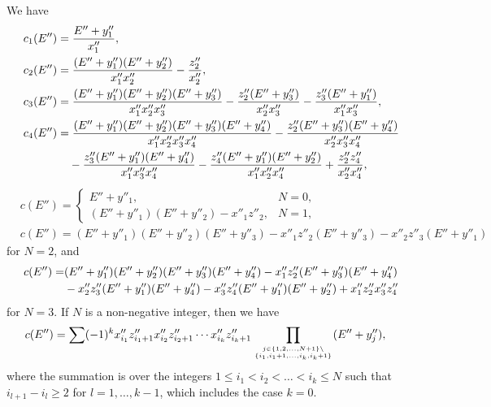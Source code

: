 \documentclass[12pt]{amsart}
\numberwithin{equation}{section}
\theoremstyle{definition}
\theoremstyle{remark}
\begin{document}
We have
\begin{align*}
 & c_{1}(E'') = \frac{E'' + y''_1}{x''_1} , \\
 & c_{2}(E'') = \frac{(E'' + y''_1 )  (E'' + y'' _2 )}{x''_1 x''_2}  - \frac{z''_2}{x''_2} , \notag \\
 & c_{3}(E'') = \frac{(E'' + y''_1 ) (E'' + y''_2) (E'' + y''_3) }{x''_1 x''_2 x''_3} - \frac{z''_2 (E'' + y''_3 )}{x''_2 x''_3} - \frac{z''_3 (E'' + y''_1) }{x''_1 x''_3} , \notag \\
 & c_{4}(E'') = \frac{(E'' + y''_1 ) (E'' + y''_2) (E'' + y''_3) (E'' + y''_4) }{x''_1 x''_2 x''_3 x''_4} - \frac{z''_2 (E'' + y''_3 ) (E'' + y''_4) }{x''_2 x''_3 x''_4}  \notag \\
& \qquad \qquad - \frac{z''_3 (E'' + y''_1) (E'' + y''_4)}{x''_1 x''_3 x''_4} - \frac{z''_4 (E'' + y''_1 )  (E'' + y'' _2 )}{x''_1 x''_2 x''_4}  + \frac{z''_2 z''_4}{x''_2 x''_4} ,  \notag 
\end{align*}
\begin{align*}
 & c (E'') = \left\{
\begin{array}{ll} 
E'' + y''_1 , & N=0 , \\
(E'' + y''_1 )  (E'' + y'' _2 ) - x''_1 z''_2 , & N=1 ,
\end{array}
\right. \\
& c (E'') =  (E'' + y''_1 ) (E'' + y''_2) (E'' + y''_3)  - x''_1 z''_2 (E'' + y''_3 ) - x''_2 z''_3 (E'' + y''_1) 
\end{align*}
for $N=2$, and
\begin{align*}
 c (E'') = & (E'' + y''_1 ) (E'' + y''_2) (E'' + y''_3) (E'' + y''_4) - x''_1 z''_2 (E'' + y''_3 ) (E'' + y''_4) \\
& - x''_2 z''_3 (E'' + y''_1) (E'' + y''_4) - x''_3 z''_4 (E'' + y''_1 ) (E'' + y'' _2 ) + x''_1 z''_2 x''_3 z''_4 \notag 
\end{align*}
for $N=3$.
If $N $ is a non-negative integer, then we have
\begin{align}
 & c (E'') = \sum (-1) ^k x''_{i_1} z'' _{i_1 +1 } x''_{i_2} z'' _{i_2 +1 } \cdots x''_{i_k} z'' _{i_k +1 }  \prod _{j \in \{ 1,2, \dots ,N +1 \} \setminus \atop{\{ i_1 , i_1 +1 , \dots , i_k , i_k +1  \} }} (E'' + y''_j ) , \label{eq:cE''sum}
\end{align}
where the summation is over the integers $1 \leq i_1 <i_2 < \dots <i_k \leq N$ such that $i_{l+1} -i_{l} \geq 2$ for $l =1, \dots , k-1$, which includes the case $k=0$.
\end{document}
